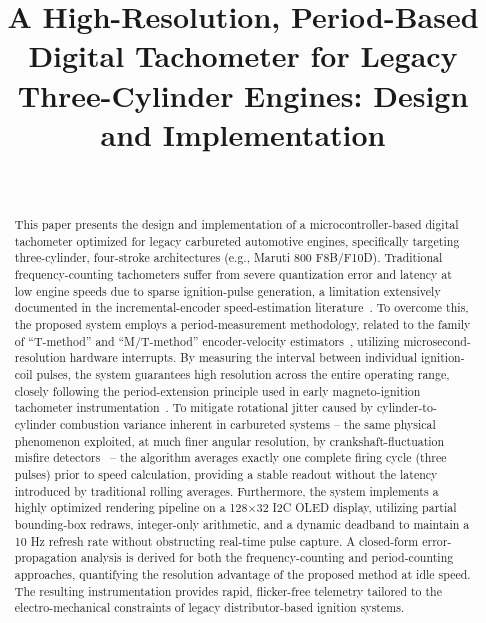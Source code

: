 \documentclass[journal, twocolumn]{IEEEtran}
\begin{document}
\title{A High-Resolution, Period-Based Digital Tachometer for Legacy Three-Cylinder Engines: Design and Implementation}

\author{
     \\
}

\maketitle

\begin{abstract}
This paper presents the design and implementation of a microcontroller-based digital tachometer optimized for legacy carbureted automotive engines, specifically targeting three-cylinder, four-stroke architectures (e.g., Maruti 800 F8B/F10D). Traditional frequency-counting tachometers suffer from severe quantization error and latency at low engine speeds due to sparse ignition-pulse generation, a limitation extensively documented in the incremental-encoder speed-estimation literature~\cite{petrella2007,motioncontroltips}. To overcome this, the proposed system employs a period-measurement methodology, related to the family of ``T-method'' and ``M/T-method'' encoder-velocity estimators~\cite{mtmethod2017,mtmethod_springer}, utilizing microsecond-resolution hardware interrupts. By measuring the interval between individual ignition-coil pulses, the system guarantees high resolution across the entire operating range, closely following the period-extension principle used in early magneto-ignition tachometer instrumentation~\cite{krattenmacher1989}. To mitigate rotational jitter caused by cylinder-to-cylinder combustion variance inherent in carbureted systems -- the same physical phenomenon exploited, at much finer angular resolution, by crankshaft-fluctuation misfire detectors~\cite{rizzoni1989,klenk1993,misfire2011} -- the algorithm averages exactly one complete firing cycle (three pulses) prior to speed calculation, providing a stable readout without the latency introduced by traditional rolling averages. Furthermore, the system implements a highly optimized rendering pipeline on a 128$\times$32 I2C OLED display, utilizing partial bounding-box redraws, integer-only arithmetic, and a dynamic deadband to maintain a 10 Hz refresh rate without obstructing real-time pulse capture. A closed-form error-propagation analysis is derived for both the frequency-counting and period-counting approaches, quantifying the resolution advantage of the proposed method at idle speed. The resulting instrumentation provides rapid, flicker-free telemetry tailored to the electro-mechanical constraints of legacy distributor-based ignition systems.
\end{abstract}
\end{document}
